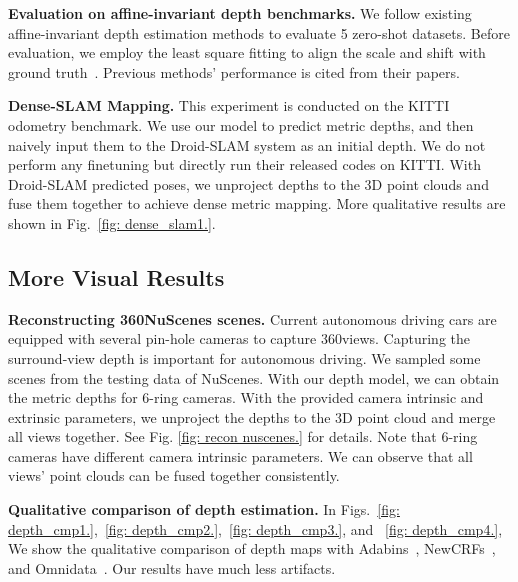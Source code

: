 \noindent\textbf{Evaluation on affine-invariant depth benchmarks.} We follow existing affine-invariant depth estimation methods to evaluate 5 zero-shot datasets. Before evaluation, we employ the least square fitting to align the scale and shift with ground truth~\cite{leres}. Previous methods' performance is cited from their papers. 

\noindent\textbf{Dense-SLAM Mapping.} This experiment is conducted on the KITTI odometry benchmark. We use our model to predict metric depths, and then naively input them to the Droid-SLAM system as an initial depth. We do not perform any finetuning but directly run their released codes on KITTI. With Droid-SLAM predicted poses, we unproject depths to the 3D point clouds and fuse them together to achieve dense metric mapping. More qualitative results are shown in Fig.~\ref{fig: dense_slam1.}.


\subsection{More Visual Results}
\noindent\textbf{Reconstructing 360\degree NuScenes scenes.} Current autonomous driving cars are equipped with several pin-hole cameras to capture 360\degree views. Capturing the surround-view depth is important for autonomous driving.  We sampled some scenes from the testing data of NuScenes. With our depth model, we can obtain the metric depths for 6-ring cameras. With the provided camera intrinsic and extrinsic parameters, we unproject the depths to the 3D point cloud and merge all views together. See Fig. \ref{fig: recon nuscenes.} for details. Note that 6-ring cameras have different camera intrinsic parameters. We can observe that all views' point clouds can be fused together consistently.


\noindent\textbf{Qualitative comparison of depth estimation.} In Figs.~\ref{fig: depth_cmp1.},~\ref{fig: depth_cmp2.},~\ref{fig: depth_cmp3.}, and ~\ref{fig: depth_cmp4.}, We show the qualitative comparison of depth maps with Adabins~\cite{bhat2021adabins}, NewCRFs~\cite{yuan2022new}, and Omnidata~\cite{eftekhar2021omnidata}. Our results have much less artifacts.

